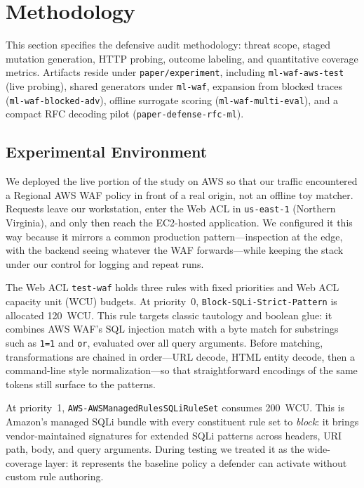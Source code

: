 \section{Methodology}
\label{sec:methodology}
This section specifies the defensive audit methodology: threat scope, staged mutation generation, HTTP probing, outcome labeling, and quantitative coverage metrics. Artifacts reside under \texttt{paper/experiment}, including \texttt{ml-waf-aws-test} (live probing), shared generators under \texttt{ml-waf}, expansion from blocked traces (\texttt{ml-waf-blocked-adv}), offline surrogate scoring (\texttt{ml-waf-multi-eval}), and a compact RFC decoding pilot (\texttt{paper-defense-rfc-ml}).

\subsection{Experimental Environment}
We deployed the live portion of the study on AWS so that our traffic encountered a Regional AWS WAF policy in front of a real origin, not an offline toy matcher. Requests leave our workstation, enter the Web ACL in \texttt{us-east-1} (Northern Virginia), and only then reach the EC2-hosted application. We configured it this way because it mirrors a common production pattern---inspection at the edge, with the backend seeing whatever the WAF forwards---while keeping the stack under our control for logging and repeat runs.

The Web ACL \texttt{test-waf} holds three rules with fixed priorities and Web ACL capacity unit (WCU) budgets. At priority~0, \texttt{Block-SQLi-Strict-Pattern} is allocated 120~WCU. This rule targets classic tautology and boolean glue: it combines AWS WAF's SQL injection match with a byte match for substrings such as \texttt{1=1} and \texttt{or}, evaluated over all query arguments. Before matching, transformations are chained in order---URL decode, HTML entity decode, then a command-line style normalization---so that straightforward encodings of the same tokens still surface to the patterns.

At priority~1, \texttt{AWS-AWSManagedRulesSQLiRuleSet} consumes 200~WCU. This is Amazon's managed SQLi bundle with every constituent rule set to \emph{block}: it brings vendor-maintained signatures for extended SQLi patterns across headers, URI path, body, and query arguments. During testing we treated it as the wide-coverage layer: it represents the baseline policy a defender can activate without custom rule authoring.

